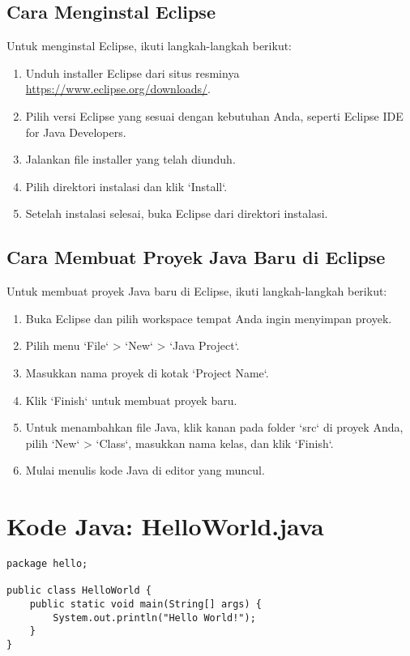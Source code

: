 \subsection{Cara Menginstal Eclipse}

Untuk menginstal Eclipse, ikuti langkah-langkah berikut:

\begin{enumerate}
	\item Unduh installer Eclipse dari situs resminya \url{https://www.eclipse.org/downloads/}.
	\item Pilih versi Eclipse yang sesuai dengan kebutuhan Anda, seperti Eclipse IDE for Java Developers.
	\item Jalankan file installer yang telah diunduh.
	\item Pilih direktori instalasi dan klik `Install`.
	\item Setelah instalasi selesai, buka Eclipse dari direktori instalasi.
\end{enumerate}

\subsection{Cara Membuat Proyek Java Baru di Eclipse}

Untuk membuat proyek Java baru di Eclipse, ikuti langkah-langkah berikut:

\begin{enumerate}
	\item Buka Eclipse dan pilih workspace tempat Anda ingin menyimpan proyek.
	\item Pilih menu `File` > `New` > `Java Project`.
	\item Masukkan nama proyek di kotak `Project Name`.
	\item Klik `Finish` untuk membuat proyek baru.
	\item Untuk menambahkan file Java, klik kanan pada folder `src` di proyek Anda, pilih `New` > `Class`, masukkan nama kelas, dan klik `Finish`.
	\item Mulai menulis kode Java di editor yang muncul.
\end{enumerate}

\section{Kode Java: HelloWorld.java}

\begin{lstlisting}[style=JavaStyle, caption={Kode Java: HelloWorld.java}]
package hello;

public class HelloWorld {
	public static void main(String[] args) {
		System.out.println("Hello World!");
	}
}
\end{lstlisting}

